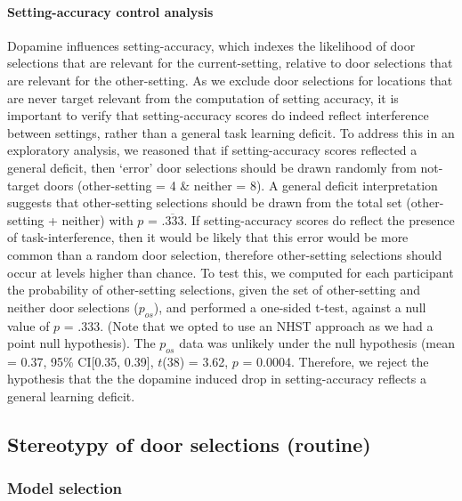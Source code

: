 \documentclass{article}
\begin{document}
\hypertarget{setting-accuracy-control-analysis}{%
\paragraph{Setting-accuracy control
analysis}\label{setting-accuracy-control-analysis}}

Dopamine influences setting-accuracy, which indexes the likelihood of
door selections that are relevant for the current-setting, relative to
door selections that are relevant for the other-setting. As we exclude
door selections for locations that are never target relevant from the
computation of setting accuracy, it is important to verify that
setting-accuracy scores do indeed reflect interference between settings,
rather than a general task learning deficit. To address this in an
exploratory analysis, we reasoned that if setting-accuracy scores
reflected a general deficit, then `error' door selections should be
drawn randomly from not-target doors (other-setting = 4 \& neither = 8).
A general deficit interpretation suggests that other-setting selections
should be drawn from the total set (other-setting + neither) with \(p\)
= \(\overline{.333}\). If setting-accuracy scores do reflect the
presence of task-interference, then it would be likely that this error
would be more common than a random door selection, therefore
other-setting selections should occur at levels higher than chance. To
test this, we computed for each participant the probability of
other-setting selections, given the set of other-setting and neither
door selections (\(p_{os}\)), and performed a one-sided t-test, against
a null value of \(p\) = .333. (Note that we opted to use an NHST
approach as we had a point null hypothesis). The \(p_{os}\) data was
unlikely under the null hypothesis (mean = 0.37, 95\% CI{[}0.35,
0.39{]}, \(t\)(38) = 3.62, \(p\) = 0.0004. Therefore, we reject the
hypothesis that the the dopamine induced drop in setting-accuracy
reflects a general learning deficit.

\hypertarget{stereotypy-of-door-selections-routine}{%
\subsection{Stereotypy of door selections
(routine)}\label{stereotypy-of-door-selections-routine}}

\hypertarget{model-selection-2}{%
\subsubsection{Model selection}\label{model-selection-2}}
\end{document}
